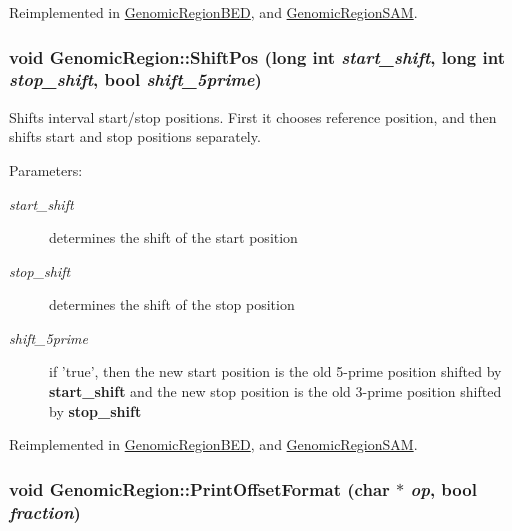 Reimplemented in \hyperlink{classGenomicRegionBED_c515c70f443db400f911452ed359433b}{GenomicRegionBED}, and \hyperlink{classGenomicRegionSAM_353207352073db00dee0a9b620dca197}{GenomicRegionSAM}.\hypertarget{classGenomicRegion_dc42fea61283fa8134d65467b2292405}{
\subsubsection[ShiftPos]{\setlength{\rightskip}{0pt plus 5cm}void GenomicRegion::ShiftPos (long int {\em start\_\-shift}, \/  long int {\em stop\_\-shift}, \/  bool {\em shift\_\-5prime})}}
\label{classGenomicRegion_dc42fea61283fa8134d65467b2292405}


Shifts interval start/stop positions. First it chooses reference position, and then shifts start and stop positions separately. 

\begin{Desc}
\item[Parameters:]
\begin{description}
\item[{\em start\_\-shift}]determines the shift of the start position \item[{\em stop\_\-shift}]determines the shift of the stop position \item[{\em shift\_\-5prime}]if 'true', then the new start position is the old 5-prime position shifted by {\bf start\_\-shift} and the new stop position is the old 3-prime position shifted by {\bf stop\_\-shift} \end{description}
\end{Desc}


Reimplemented in \hyperlink{classGenomicRegionBED_97d00cb29eb1f379b9e6ee17197530c7}{GenomicRegionBED}, and \hyperlink{classGenomicRegionSAM_c6c559782775bfc65907801148226590}{GenomicRegionSAM}.\hypertarget{classGenomicRegion_33d1e5544b3fb81e8c19468b91920b1d}{
\subsubsection[PrintOffsetFormat]{\setlength{\rightskip}{0pt plus 5cm}void GenomicRegion::PrintOffsetFormat (char $\ast$ {\em op}, \/  bool {\em fraction})}}
\label{classGenomicRegion_33d1e5544b3fb81e8c19468b91920b1d}



